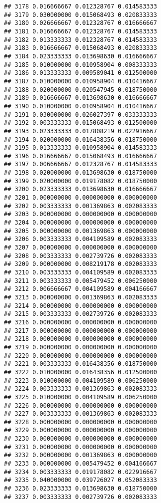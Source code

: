 \documentclass[
]{article}
\begin{document}
\begin{verbatim}
## 3178 0.016666667 0.012328767 0.014583333
## 3179 0.030000000 0.015068493 0.020833333
## 3180 0.026666667 0.012328767 0.016666667
## 3181 0.016666667 0.012328767 0.014583333
## 3182 0.013333333 0.012328767 0.014583333
## 3183 0.016666667 0.015068493 0.020833333
## 3184 0.023333333 0.013698630 0.016666667
## 3185 0.010000000 0.010958904 0.008333333
## 3186 0.013333333 0.009589041 0.012500000
## 3187 0.010000000 0.010958904 0.010416667
## 3188 0.020000000 0.020547945 0.018750000
## 3189 0.016666667 0.013698630 0.016666667
## 3190 0.010000000 0.010958904 0.010416667
## 3191 0.030000000 0.026027397 0.033333333
## 3192 0.003333333 0.015068493 0.012500000
## 3193 0.023333333 0.017808219 0.022916667
## 3194 0.020000000 0.016438356 0.018750000
## 3195 0.013333333 0.010958904 0.014583333
## 3196 0.016666667 0.015068493 0.016666667
## 3197 0.006666667 0.012328767 0.014583333
## 3198 0.020000000 0.013698630 0.018750000
## 3199 0.020000000 0.019178082 0.018750000
## 3200 0.023333333 0.013698630 0.016666667
## 3201 0.000000000 0.000000000 0.000000000
## 3202 0.003333333 0.001369863 0.002083333
## 3203 0.000000000 0.000000000 0.000000000
## 3204 0.000000000 0.000000000 0.000000000
## 3205 0.000000000 0.001369863 0.000000000
## 3206 0.003333333 0.004109589 0.002083333
## 3207 0.000000000 0.000000000 0.000000000
## 3208 0.003333333 0.002739726 0.002083333
## 3209 0.000000000 0.008219178 0.002083333
## 3210 0.003333333 0.004109589 0.002083333
## 3211 0.003333333 0.005479452 0.006250000
## 3212 0.006666667 0.004109589 0.004166667
## 3213 0.000000000 0.001369863 0.002083333
## 3214 0.000000000 0.000000000 0.000000000
## 3215 0.003333333 0.002739726 0.002083333
## 3216 0.000000000 0.000000000 0.000000000
## 3217 0.000000000 0.000000000 0.000000000
## 3218 0.000000000 0.000000000 0.000000000
## 3219 0.000000000 0.000000000 0.000000000
## 3220 0.000000000 0.000000000 0.000000000
## 3221 0.003333333 0.016438356 0.018750000
## 3222 0.010000000 0.016438356 0.012500000
## 3223 0.010000000 0.004109589 0.006250000
## 3224 0.003333333 0.001369863 0.002083333
## 3225 0.010000000 0.004109589 0.006250000
## 3226 0.000000000 0.000000000 0.000000000
## 3227 0.003333333 0.001369863 0.002083333
## 3228 0.000000000 0.000000000 0.000000000
## 3229 0.000000000 0.000000000 0.000000000
## 3230 0.000000000 0.000000000 0.000000000
## 3231 0.000000000 0.000000000 0.000000000
## 3232 0.000000000 0.001369863 0.000000000
## 3233 0.000000000 0.005479452 0.004166667
## 3234 0.003333333 0.019178082 0.022916667
## 3235 0.040000000 0.039726027 0.052083333
## 3236 0.023333333 0.013698630 0.018750000
## 3237 0.003333333 0.002739726 0.002083333

\end{verbatim}
\end{document}
